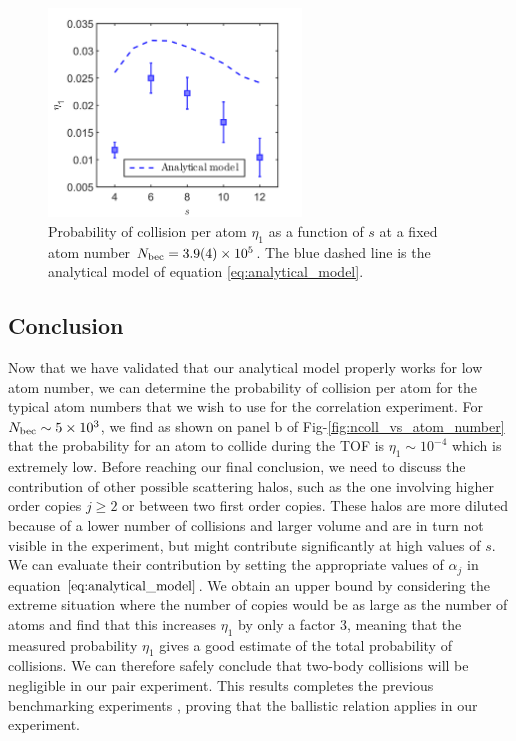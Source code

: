  \begin{figure}
     \centering
     \includegraphics[width=0.6\textwidth]{Fig/Chapter3/ncoll_vs_s.png}
     \caption{Probability of collision per atom $\eta_1$ as a function of $s$ at a fixed atom number $N_{\rm{bec}}=3.9(4) \times 10^5$. The blue dashed line is the analytical model of equation \ref{eq:analytical_model}.}
     \label{fig:ncoll_vs_s}
 \end{figure}

\subsection{Conclusion}

Now that we have validated that our analytical model properly works for low atom number, we can determine the probability of collision per atom for the typical atom numbers that we wish to use for the \kmk correlation experiment. For $N_{\rm{bec}} \sim 5 \times 10^3$, we find as shown on panel b of Fig-\ref{fig:ncoll_vs_atom_number} that the probability for an atom to collide during the TOF is $\eta_1 \sim 10^{-4}$ which is extremely low. Before reaching our final conclusion, we need to discuss the contribution of other possible scattering halos, such as the one involving higher order copies $j \geq 2$ or between two first order copies. These halos are more diluted because of a lower number of collisions and larger volume and are in turn not visible in the experiment, but might contribute significantly at high values of $s$. We can evaluate their contribution by setting the appropriate values of $\alpha_j$ in equation $\ref{eq:analytical_model}$. We obtain an upper bound by considering the extreme situation where the number of copies would be as large as the number of atoms and find that this increases $\eta_1$ by only a factor 3, meaning that the measured probability $\eta_1$ gives a good estimate of the total probability of collisions. We can therefore safely conclude that two-body collisions will be negligible in our \kmk pair experiment. This results completes the previous benchmarking experiments \cite{cayla2018single}, proving that the ballistic relation applies in our experiment.


